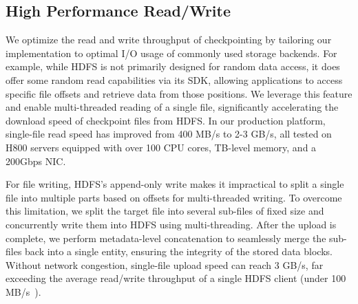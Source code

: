 
\subsection{High Performance Read/Write}\label{sec:io_parallel}
We optimize the read and write throughput of checkpointing by tailoring our implementation to optimal I/O %
usage of commonly used storage backends. For example, while HDFS is not primarily designed for random data access, it does offer some random read capabilities via its SDK, allowing applications to access specific file offsets and retrieve data from those positions. We leverage this feature %
and enable multi-threaded reading of a single file, significantly accelerating the download speed of checkpoint files from HDFS. In our production platform, single-file read speed has improved from 400 MB/s to 2-3 GB/s, all tested on H800 servers equipped with over 100 CPU cores, TB-level memory, and a 200Gbps NIC.

For file writing, HDFS's append-only write makes it impractical to split a single file into multiple parts based on offsets for multi-threaded writing. To overcome this limitation, we split the target file into several sub-files of fixed size and concurrently write them into HDFS using multi-threading.
After the upload is complete, we perform metadata-level concatenation to seamlessly merge the sub-files back into a single entity, ensuring the integrity of the stored data blocks. 
Without network congestion, single-file upload speed can reach 3 GB/s, far exceeding the average read/write throughput of a single HDFS client (under 100 MB/s~\cite{shvachko2010hdfs}). 

